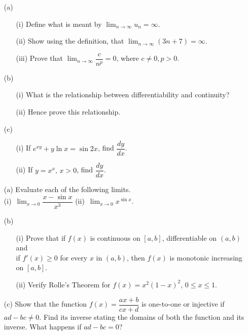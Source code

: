 \documentclass[12pt]{uz-exame}
\begin{document}
\begin{question}
\begin{itemize}
\item[(a)]\begin{itemize}
\item[(i)] Define what is meant by $\displaystyle \lim _{n\rightarrow \infty} u_n=\infty$. 
\item[(ii)] Show using the definition, that $\displaystyle \lim _{n\rightarrow \infty}(3n+7) =\infty$. 
\item[(iii)] Prove that $\displaystyle \lim _{n\rightarrow \infty}\dfrac{c}{n^p}=0$, where $c\neq 0, p>0$. 
\end{itemize}
\item[(b)] \begin{itemize}
\item[(i)] What is the relationship between differentiability and continuity? 
\item[(ii)] Hence prove this relationship.
\end{itemize}
\item[(c)]\begin{itemize}
\item[(i)] If $e^{xy}+y\ln x =\sin 2x$, find $\dfrac{dy}{dx}$. 
\item[(ii)] If $y=x^x, \, x>0$, find $\dfrac{dy}{dx}$. 
\end{itemize}
\end{itemize}
\end{question}
\newpage
\begin{question}
\begin{itemize}
\item[(a)] Evaluate each of the following limits.\\
(i)\, $\displaystyle \lim _{x\rightarrow 0}\dfrac{x-\sin x}{x^3}$ \quad \quad (ii)\, $\displaystyle \lim _{x\rightarrow 0}x^{\sin x}$. 
\item[(b)] \begin{itemize}
\item[(i)] Prove that if $f(x)$ is continuous on $[a,b]$, differentiable on $(a,b)$ and\\ if $f'(x)\geq 0$ for every $x$ in $(a,b)$, then $f(x)$ is monotonic increasing on $[a,b]$.
\item[(ii)] Verify Rolle's Theorem for $f(x)=x^2(1-x)^2, \, 0\leq x \leq 1$. 
\end{itemize}
\item[(c)] Show that the function $f(x)=\dfrac{ax+b}{cx+d}$ is one-to-one or injective if $ad-bc\neq 0$. Find its inverse stating the domains of both the function and its inverse. What happens if $ad-bc=0$? 
\end{itemize}
\end{question}
\end{document}
